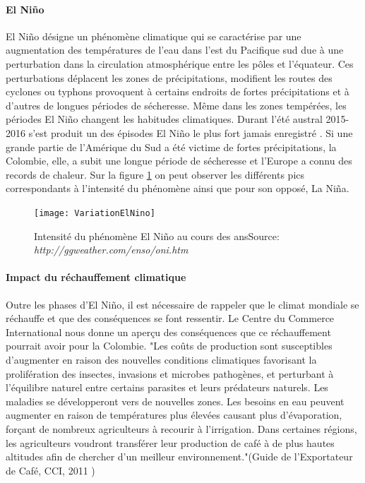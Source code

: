 \paragraph{El Niño}El Niño désigne un phénomène climatique qui se caractérise par une augmentation des températures de l'eau dans l'est du Pacifique sud due à une perturbation dans la circulation atmosphérique entre les pôles et l'équateur. Ces perturbations déplacent les zones de précipitations, modifient les routes des cyclones ou typhons provoquent à certains endroits de fortes précipitations et à d'autres de longues périodes de sécheresse. Même dans les zones tempérées, les périodes El Niño changent les habitudes climatiques. Durant l'été austral 2015-2016 s'est produit un des épisodes El Niño le plus fort jamais enregistré\cite{OMM} \cite{actulatino_2016}. Si une grande partie de l'Amérique du Sud a été victime de fortes précipitations, la Colombie, elle, a subit une longue période de sécheresse et l'Europe a connu des records de chaleur. Sur la figure \ref{Nino} on peut observer les différents pics correspondants à l'intensité du phénomène ainsi que pour son opposé, La Niña. 

\begin{figure}[H]
	\centering
	\texttt{[image: VariationElNino]}
	\caption{\label{Nino} Intensité du phénomène El Niño au cours des ans\newline Source: \textit{http://ggweather.com/enso/oni.htm}}
\end{figure}

\paragraph{Impact du réchauffement climatique} Outre les phases d'El Niño, il est nécessaire de rappeler que le climat mondiale se réchauffe et que des conséquences se font ressentir. Le Centre du Commerce International \cite{CCI} nous donne un aperçu des conséquences que ce réchauffement pourrait avoir pour la Colombie. "Les coûts de production sont susceptibles d'augmenter en raison des nouvelles conditions climatiques favorisant la prolifération des insectes, invasions et microbes pathogènes, et perturbant à l'équilibre naturel entre certains parasites et leurs prédateurs naturels. Les maladies se développeront vers de nouvelles zones. Les besoins en eau peuvent augmenter en raison de températures plus élevées causant plus d'évaporation, forçant de nombreux agriculteurs à recourir à l'irrigation. Dans certaines régions, les agriculteurs voudront transférer leur production de café à de plus hautes altitudes afin de chercher d'un meilleur environnement."(Guide de l'Exportateur de Café, CCI, 2011 \cite{GuideCafe})


